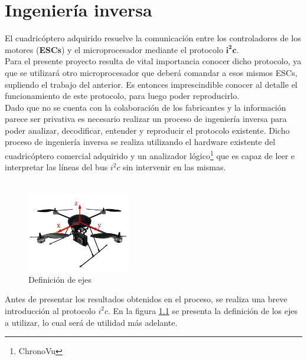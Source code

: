 \documentclass[main]{subfiles}
\begin{document}
\chapter{Ingenier\'ia inversa}

El cuadric\'optero adquirido resuelve la comunicaci\'on entre los controladores de los motores (\textbf{ESCs}) y el microprocesador mediante el protocolo $\mathbf{i^2c}$.\\

Para el presente proyecto resulta de vital importancia conocer dicho protocolo, ya que se utilizar\'a otro microprocesador que deber\'a comandar a esos mismos ESCs, supliendo el trabajo del anterior. Es entonces imprescindible conocer al detalle el funcionamiento de este protocolo, para luego poder reproducirlo.\\

Dado que no se cuenta con la colaboraci\'on de los fabricantes y la informaci\'on parece ser privativa es necesario realizar un proceso de ingenier\'ia inversa para poder analizar, decodificar, entender y reproducir el protocolo existente. Dicho proceso de ingenier\'ia inversa se realiza utilizando el hardware existente del cuadric\'optero comercial adquirido y un analizador l\'ogico\footnote{ChronoVu} que es capaz de leer e interpretar las l\'ineas del bus $i^2c$ sin intervenir en las mismas.\\ \\

\begin{figure}
	\vspace{-40pt}
	\begin{center}
	\includegraphics[width=0.4\textwidth]{./pics_sniffer/ejes_quad.jpg}
	\end{center}
	\vspace{-20pt}
	\caption{Definici\'on de ejes}
	\label{fig:ejes_quad}
	\vspace{-70pt}
\end{figure}

Antes de presentar los resultados obtenidos en el proceso, se realiza una breve introducci\'on al protocolo $i^2c$. En la figura \ref{fig:ejes_quad} se presenta la definici\'on de los ejes a utilizar, lo cual ser\'a de utilidad m\'as adelante.
\end{document}
